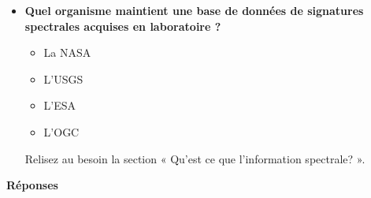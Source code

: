 \documentclass[
  french,
  11pt,
  letterpaper,
  open=any,
  twoside=false,
  french]{scrbook}
\providecommand{\tightlist}{%
  \setlength{\itemsep}{0pt}\setlength{\parskip}{0pt}}
\begin{document}
\begin{itemize}
  Relisez au besoin la section « Qu'est ce que l'information spectrale?
  ».
\item
  \textbf{Quel organisme maintient une base de données de signatures
  spectrales acquises en laboratoire ?}

  \begin{itemize}
  \tightlist
  \item
    La NASA
  \item
    L'USGS
  \item
    L'ESA
  \item
    L'OGC
  \end{itemize}

  Relisez au besoin la section « Qu'est ce que l'information spectrale?
  ».
\end{itemize}

\textbf{Réponses}
\end{document}
